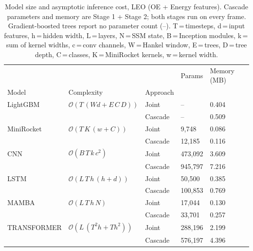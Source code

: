 \begin{table}
\centering
\caption{Model size and asymptotic inference cost, LEO (OE + Energy features). Cascade parameters and memory are Stage 1 + Stage 2; both stages run on every frame. Gradient-boosted trees report no parameter count (--). T\,=\,timesteps, d\,=\,input features, h\,=\,hidden width, L\,=\,layers, N\,=\,SSM state, B\,=\,Inception modules, k\,=\,sum of kernel widths, c\,=\,conv channels, W\,=\,Hankel window, E\,=\,trees, D\,=\,tree depth, C\,=\,classes, K\,=\,MiniRocket kernels, w\,=\,kernel width.}
\label{tab:complexity_leo}
\begin{tabular}{lllll}
\toprule
            &                                   &         &     Params & Memory (MB) \\
Model & Complexity & Approach &            &             \\
\midrule
LightGBM & $\mathcal{O}(T\,(W d + E\,C\,D))$ & Joint &         -- &       0.404 \\
            &                                   & Cascade &         -- &       0.509 \\
MiniRocket & $\mathcal{O}(T\,K\,(w + C))$ & Joint &    9{,}748 &       0.086 \\
            &                                   & Cascade &   12{,}185 &       0.116 \\
CNN & $\mathcal{O}(B\,T\,k\,c^2)$ & Joint &  473{,}092 &       3.609 \\
            &                                   & Cascade &  945{,}797 &       7.216 \\
LSTM & $\mathcal{O}(L\,T\,h\,(h+d))$ & Joint &   50{,}500 &       0.385 \\
            &                                   & Cascade &  100{,}853 &       0.769 \\
MAMBA & $\mathcal{O}(L\,T\,h\,N)$ & Joint &   17{,}044 &       0.130 \\
            &                                   & Cascade &   33{,}701 &       0.257 \\
TRANSFORMER & $\mathcal{O}(L\,(T^2 h + T h^2))$ & Joint &  288{,}196 &       2.199 \\
            &                                   & Cascade &  576{,}197 &       4.396 \\
\bottomrule
\end{tabular}
\end{table}
